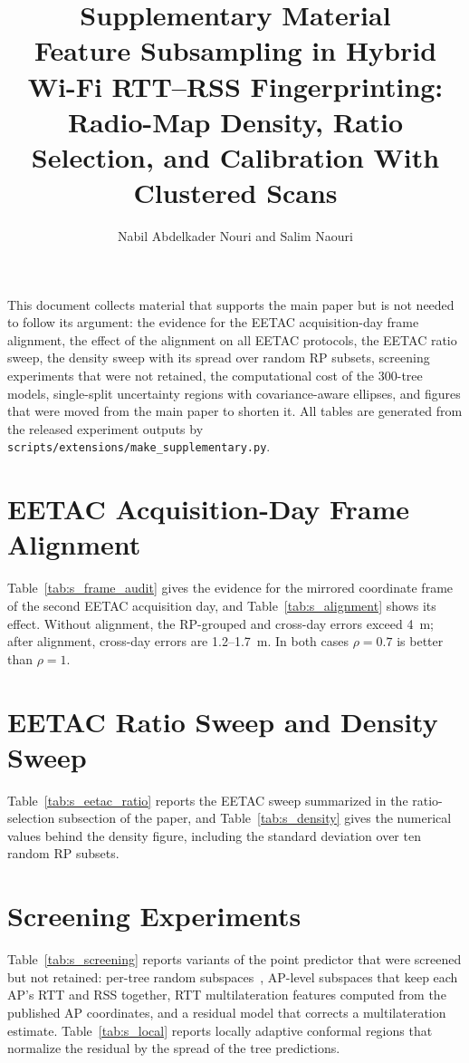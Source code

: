 \documentclass[10pt]{article}
\title{Supplementary Material\\ \large Feature Subsampling in Hybrid Wi-Fi RTT--RSS Fingerprinting: Radio-Map Density, Ratio Selection, and Calibration With Clustered Scans}
\author{Nabil Abdelkader Nouri and Salim Naouri}
\date{}
\begin{document}
\maketitle

This document collects material that supports the main paper but is not needed to follow its argument: the evidence for the EETAC acquisition-day frame alignment, the effect of the alignment on all EETAC protocols, the EETAC ratio sweep, the density sweep with its spread over random RP subsets, screening experiments that were not retained, the computational cost of the 300-tree models, single-split uncertainty regions with covariance-aware ellipses, and figures that were moved from the main paper to shorten it. All tables are generated from the released experiment outputs by \texttt{scripts/extensions/make\_supplementary.py}.

\section{EETAC Acquisition-Day Frame Alignment}

Table~\ref{tab:s_frame_audit} gives the evidence for the mirrored coordinate frame of the second EETAC acquisition day, and Table~\ref{tab:s_alignment} shows its effect. Without alignment, the RP-grouped and cross-day errors exceed 4~m; after alignment, cross-day errors are 1.2--1.7~m. In both cases $\rho=0.7$ is better than $\rho=1$.

\section{EETAC Ratio Sweep and Density Sweep}

Table~\ref{tab:s_eetac_ratio} reports the EETAC sweep summarized in the ratio-selection subsection of the paper, and Table~\ref{tab:s_density} gives the numerical values behind the density figure, including the standard deviation over ten random RP subsets.

\section{Screening Experiments}

Table~\ref{tab:s_screening} reports variants of the point predictor that were screened but not retained: per-tree random subspaces~\cite{ho1998random}, AP-level subspaces that keep each AP's RTT and RSS together, RTT multilateration features computed from the published AP coordinates, and a residual model that corrects a multilateration estimate. Table~\ref{tab:s_local} reports locally adaptive conformal regions that normalize the residual by the spread of the tree predictions.
\end{document}
